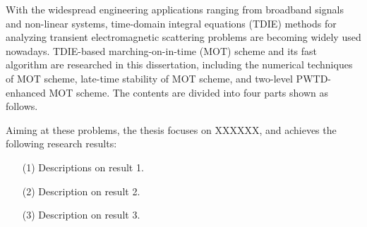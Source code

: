 \documentclass{standalone}
\begin{document}
\begin{englishabstract}
	With the widespread engineering applications ranging from broadband signals and non-linear systems, time-domain integral equations (TDIE) methods for analyzing transient electromagnetic scattering problems are becoming widely used nowadays. TDIE-based marching-on-in-time (MOT) scheme and its fast algorithm are researched in this dissertation, including the numerical techniques of MOT scheme, late-time stability of MOT scheme, and two-level PWTD-enhanced MOT scheme. The contents are divided into four parts shown as follows.
	
	
	Aiming at these problems, the thesis focuses on XXXXXX, and achieves the following research results:	
	\begin{enumerate}[labelsep = .5em, leftmargin = 0pt, itemindent = 3.8em]
	\item[(1)] 
	Descriptions on result 1.
	\item[(2)] 
	Description on result 2.
	\item[(3)] 
	Description on result 3.
	\end{enumerate}
	
	
\end{englishabstract}
\end{document}
